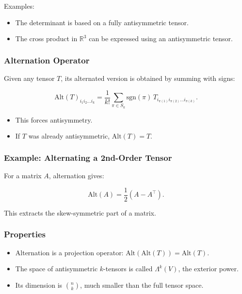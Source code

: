 \documentclass[
  letterpaper,
  DIV=11,
  numbers=noendperiod]{scrreprt}
\providecommand{\tightlist}{%
  \setlength{\itemsep}{0pt}\setlength{\parskip}{0pt}}
\begin{document}
Examples:

\begin{itemize}
\tightlist
\item
  The determinant is based on a fully antisymmetric tensor.
\item
  The cross product in \(\mathbb{R}^3\) can be expressed using an
  antisymmetric tensor.
\end{itemize}

\subsubsection{Alternation Operator}\label{alternation-operator}

Given any tensor \(T\), its alternated version is obtained by summing
with signs:

\[
\mathrm{Alt}(T)_{i_1 i_2 \dots i_k} = \frac{1}{k!} \sum_{\pi \in S_k} \mathrm{sgn}(\pi) \, T_{i_{\pi(1)} i_{\pi(2)} \dots i_{\pi(k)}}.
\]

\begin{itemize}
\tightlist
\item
  This forces antisymmetry.
\item
  If \(T\) was already antisymmetric, \(\mathrm{Alt}(T) = T\).
\end{itemize}

\subsubsection{Example: Alternating a 2nd-Order
Tensor}\label{example-alternating-a-2nd-order-tensor}

For a matrix \(A\), alternation gives:

\[
\mathrm{Alt}(A) = \frac{1}{2}(A - A^\top).
\]

This extracts the skew-symmetric part of a matrix.

\subsubsection{Properties}\label{properties-2}

\begin{itemize}
\tightlist
\item
  Alternation is a projection operator:
  \(\mathrm{Alt}(\mathrm{Alt}(T)) = \mathrm{Alt}(T)\).
\item
  The space of antisymmetric \(k\)-tensors is called \(\Lambda^k(V)\),
  the exterior power.
\item
  Its dimension is \(\binom{n}{k}\), much smaller than the full tensor
  space.
\end{itemize}
\end{document}
